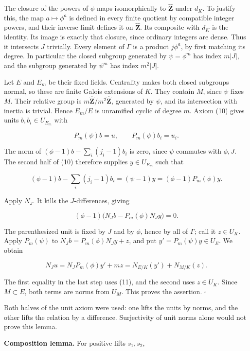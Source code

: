 \documentclass[11pt,a4paper]{article}
\begin{document}
The closure of the powers of \(\phi\) maps isomorphically to
\(\widehat{\mathbf Z}\) under \(d_K\). To justify this, the map
\(a\mapsto\phi^a\) is defined in every finite quotient by compatible
integer powers, and their inverse limit defines it on
\(\widehat{\mathbf Z}\). Its composite with \(d_K\) is the identity. Its
image is exactly that closure, since ordinary integers are dense. Thus
it intersects \(J\) trivially. Every element of \(\Gamma\) is a product
\(j\phi^a\), by first matching its degree. In particular the closed
subgroup generated by \(\psi=\phi^m\) has index \(m|J|\), and the
subgroup generated by \(\psi^m\) has index \(m^2|J|\).

Let \(E\) and \(E_m\) be their fixed fields. Centrality makes both
closed subgroups normal, so these are finite Galois extensions of \(K\).
They contain \(M\), since \(\psi\) fixes \(M\). Their relative group is
\(m\widehat{\mathbf Z}/m^2\widehat{\mathbf Z}\), generated by \(\psi\),
and its intersection with inertia is trivial. Hence \(E_m/E\) is
unramified cyclic of degree \(m\). Axiom (10) gives units
\(b,b_i\in U_{E_m}\) with

\[
P_m(\psi)b=u,\qquad P_m(\psi)b_i=u_i.
\]

The norm of \((\phi-1)b-\sum_i(j_i-1)b_i\) is zero, since \(\psi\)
commutes with \(\phi,J\). The second half of (10) therefore supplies
\(y\in U_{E_m}\) such that

\[
(\phi-1)b-\sum_i(j_i-1)b_i
=(\psi-1)y=(\phi-1)P_m(\phi)y.
\]

Apply \(N_J\). It kills the \(J\)-differences, giving

\[
(\phi-1)\bigl(N_Jb-P_m(\phi)N_Jy\bigr)=0.
\]

The parenthesized unit is fixed by \(J\) and by \(\phi\), hence by all
of \(\Gamma\); call it \(z\in U_K\). Apply \(P_m(\psi)\) to
\(N_Jb=P_m(\phi)N_Jy+z\), and put \(y'=P_m(\psi)y\in U_E\). We obtain

\[
N_Ju=N_JP_m(\phi)y'+mz
=N_{E/K}(y')+N_{M/K}(z).
\]

The first equality in the last step uses (11), and the second uses
\(z\in U_K\). Since \(M\subset E\), both terms are norms from \(U_M\).
This proves the assertion. \(\square\)

Both halves of the unit axiom were used: one lifts the units by norms,
and the other lifts the relation by a difference. Surjectivity of unit
norms alone would not prove this lemma.

\textbf{Composition lemma.} For positive lifts \(s_1,s_2\),
\end{document}
